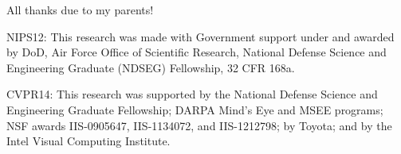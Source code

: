 \begin{acknowledgements}

All thanks due to my parents!

NIPS12:
This research was made with Government support under and awarded by DoD, Air Force Office of Scientific Research, National Defense Science and Engineering Graduate (NDSEG) Fellowship, 32 CFR 168a.

CVPR14:
This research was supported by the National Defense Science and Engineering Graduate Fellowship; DARPA Mind's Eye and MSEE programs; NSF awards IIS-0905647, IIS-1134072, and IIS-1212798; by Toyota; and by the Intel Visual Computing Institute.
\end{acknowledgements}
